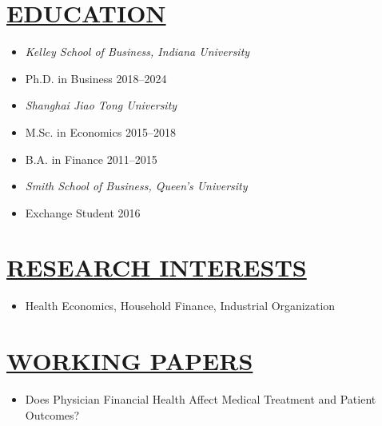 \documentclass{res}
\begin{document}
\begin{resume}
\section{\large{\ul{EDUCATION}}}
\vspace{1.8em}
\begin{itemize}[leftmargin=!,labelindent=-15pt,itemindent=-15pt,itemsep=0.1em]
  \item[] \textit{Kelley School of Business, Indiana University} 
  \item[] \hspace{15pt} Ph.D. in Business \hfill    2018--2024 
  \item[] \textit{Shanghai Jiao Tong University}                                  
  \item[] \hspace{15pt} M.Sc. in Economics     \hfill    2015--2018
  \item[] \hspace{15pt} B.A. in Finance  \hfill    2011--2015
  \item[] \textit{Smith School of Business, Queen's University}                                         
  \item[] \hspace{15pt} Exchange Student \hfill     2016
\end{itemize}

\section{\large{\ul{RESEARCH INTERESTS}}}
\vspace{1.8em}
\begin{itemize}[leftmargin=!,labelindent=-15pt,itemindent=-15pt,itemsep=0.1em]
  \item[] Health Economics, Household Finance, Industrial Organization 
\end{itemize}

\section{\large{\ul{WORKING PAPERS}}}
\vspace{1.8em}
\begin{itemize}[leftmargin=!,labelindent=-15pt,itemindent=-15pt,itemsep=0.1em]
    \item[] Does Physician Financial Health Affect Medical Treatment and Patient Outcomes?   
\end{itemize}


\end{resume}
\end{document}
